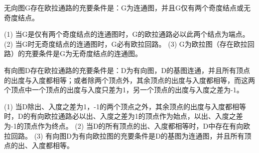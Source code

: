 \begin{theorem}
无向图G存在欧拉通路的充要条件是：G为连通图，并且G仅有两个奇度结点或无奇度结点。
\end{theorem}

\begin{corollary}
(1) 当G是仅有两个奇度结点的连通图时，G的欧拉通路必以此两个结点为端点。
(2) 当G时无奇度结点的连通图时，G必有欧拉回路。
(3) G为欧拉图（存在欧拉回路）的充要条件是G为无奇度结点的连通图。
\end{corollary}

\begin{theorem}
有向图D存在欧拉通路的充要条件是：D为有向图，D的基图连通，并且所有顶点的出度与入度都相等；或者除两个顶点外，其余顶点的出度与入度都相等，而这两个顶点中一个顶点的出度与入度只差为1，另一个顶点的出度与入度之差为-1。
\end{theorem}

\begin{corollary}
(1) 当D除出、入度之差为1，-1的两个顶点之外，其余顶点的出度与入度都相等时，D的有向欧拉通路必以出、入度之差为1的顶点作为始点，以出、入度之差为-1的顶点作为终点。
(2) 当D的所有顶点的出、入度都相等时，D中存在有向欧拉回路。
(3) 有向图D为有向欧拉图的充要条件是D的基图为连通图，并且所有顶点的出、入度都相等。
\end{corollary}
